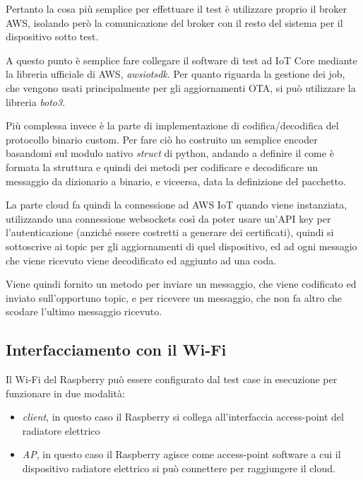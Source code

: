 \documentclass[12pt,a4paper,twoside,titlepage]{book}
\begin{document}
Pertanto la cosa più semplice per effettuare il test è utilizzare proprio il broker
AWS, isolando però la comunicazione del broker con il resto del sistema per il dispositivo
sotto test.

A questo punto è semplice fare collegare il software di test ad IoT Core mediante
la libreria ufficiale di AWS, \textit{awsiotsdk}. Per quanto riguarda la gestione
dei job, che vengono usati principalmente per gli aggiornamenti OTA, si può utilizzare
la libreria \textit{boto3}.

Più complessa invece è la parte di implementazione di codifica/decodifica del protocollo
binario custom. Per fare ciò ho costruito un semplice encoder basandomi sul modulo
nativo \textit{struct} di python, andando a definire il come è formata la struttura
e quindi dei metodi per codificare e decodificare un messaggio da dizionario a binario,
e viceersa, data la definizione del pacchetto.

La parte cloud fa quindi la connessione ad AWS IoT quando viene instanziata, utilizzando
una connessione websockets così da poter usare un'API key per l'autenticazione (anziché
essere costretti a generare dei certificati), quindi si sottoscrive ai topic per gli
aggiornamenti di quel dispositivo, ed ad ogni messagio che viene ricevuto viene decodificato
ed aggiunto ad una coda.

Viene quindi fornito un metodo per inviare un messaggio, che viene codificato ed
inviato sull'opportuno topic, e per ricevere un messaggio, che non fa altro che scodare
l'ultimo messaggio ricevuto.


\subsection{Interfacciamento con il Wi-Fi}

Il Wi-Fi del Raspberry può essere configurato dal test case in esecuzione per
funzionare in due modalità:

\begin{itemize}
    \item \textit{client}, in questo caso il Raspberry si collega all'interfaccia
        access-point del radiatore elettrico
    \item \textit{AP}, in questo caso il Raspberry agisce come access-point software
        a cui il dispositivo radiatore elettrico si può connettere per raggiungere il
        cloud.
\end{itemize}
\end{document}
